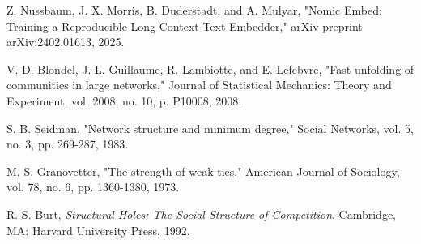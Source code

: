 \documentclass{svproc}
\begin{document}
\begin{thebibliography}{00}
 Z. Nussbaum, J. X. Morris, B. Duderstadt, and A. Mulyar, "Nomic Embed: Training a Reproducible Long Context Text Embedder," arXiv preprint arXiv:2402.01613, 2025.

 V. D. Blondel, J.-L. Guillaume, R. Lambiotte, and E. Lefebvre, "Fast unfolding of communities in large networks," Journal of Statistical Mechanics: Theory and Experiment, vol. 2008, no. 10, p. P10008, 2008.

 S. B. Seidman, "Network structure and minimum degree," Social Networks, vol. 5, no. 3, pp. 269-287, 1983.

 M. S. Granovetter, "The strength of weak ties," American Journal of Sociology, vol. 78, no. 6, pp. 1360-1380, 1973.

 R. S. Burt, \emph{Structural Holes: The Social Structure of Competition}. Cambridge, MA: Harvard University Press, 1992.

\end{thebibliography}
\end{document}
